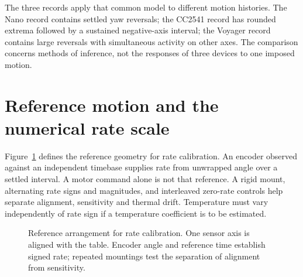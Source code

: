 The three records apply that common model to different motion histories. The Nano record contains settled yaw reversals; the CC2541 record has rounded extrema followed by a sustained negative-axis interval; the Voyager record contains large reversals with simultaneous activity on other axes. The comparison concerns methods of inference, not the responses of three devices to one imposed motion.

\section{Reference motion and the numerical rate scale}
Figure~\ref{fig:gyro-apparatus} defines the reference geometry for rate calibration. An encoder observed against an independent timebase supplies rate from unwrapped angle over a settled interval. A motor command alone is not that reference. A rigid mount, alternating rate signs and magnitudes, and interleaved zero-rate controls help separate alignment, sensitivity and thermal drift. Temperature must vary independently of rate sign if a temperature coefficient is to be estimated.

\begin{figure}[t]
\centering
{}
\caption{Reference arrangement for rate calibration. One sensor axis is aligned with the table. Encoder angle and reference time establish signed rate; repeated mountings test the separation of alignment from sensitivity.}
\label{fig:gyro-apparatus}
\end{figure}


